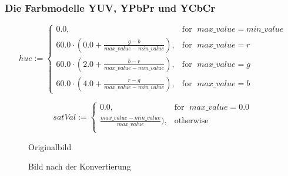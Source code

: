 \documentclass[a4paper,12pt,abstracton,titlepage]{scrartcl}
\begin{document}
\vspace{1em}
\subsubsection{Die Farbmodelle YUV, YPbPr und YCbCr}

\[    hue := \left\{\begin{array}{lr}
        0.0, & \text{for }\; max\_value = min\_value\\
        60.0 \cdot \left( 0.0 + \frac {g - b} {max\_value - min\_value} \right), & \text{for }\; max\_value = r\\
        60.0 \cdot \left( 2.0 + \frac {b - r} {max\_value - min\_value} \right), & \text{for }\; max\_value = g\\
        60.0 \cdot \left( 4.0 + \frac {r - g} {max\_value - min\_value} \right), & \text{for }\; max\_value = b
        \end{array}\right.
  \]  


\[
    satVal := \left\{\begin{array}{lr}
        0.0, & \text{for }\; max\_value = 0.0\\
        \frac {max\_value - min\_value} {max\_value}), & \text{otherwise }\; \\
        \end{array}\right.
  \]  


\begin{figure}[htbp]
\begin{minipage}[t]{0.48\textwidth}
  \begin{center}
    \caption{Originalbild}
    \label{originalScot}
  \end{center}
\end{minipage}
\begin{minipage}[t]{0.52\textwidth}
  \begin{center}
    \caption{Bild nach der Konvertierung}
    \label{rgb2hsv}
  \end{center}
\end{minipage}
\end{figure}
\end{document}

